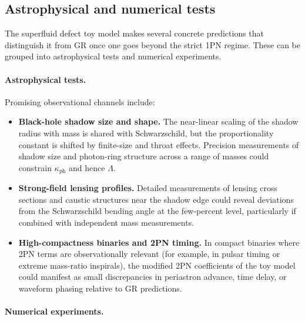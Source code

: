 \documentclass[11pt]{article}
\begin{document}
\subsection{Astrophysical and numerical tests}
\label{subsec:predictions-tests}

The superfluid defect toy model makes several concrete predictions that
distinguish it from GR once one goes beyond the strict 1PN regime.  These
can be grouped into astrophysical tests and numerical experiments.

\paragraph{Astrophysical tests.}

Promising observational channels include:
\begin{itemize}
  \item \textbf{Black-hole shadow size and shape.}
        The near-linear scaling of the shadow radius with mass is shared
        with Schwarzschild, but the proportionality constant is shifted by
        finite-size and throat effects.  Precision measurements of shadow
        size and photon-ring structure across a range of masses could
        constrain \(\kappa_{\text{ph}}\) and hence \(\Lambda\).
  \item \textbf{Strong-field lensing profiles.}
        Detailed measurements of lensing cross sections and caustic
        structures near the shadow edge could reveal deviations from the
        Schwarzschild bending angle at the few-percent level, particularly
        if combined with independent mass measurements.
  \item \textbf{High-compactness binaries and 2PN timing.}
        In compact binaries where 2PN terms are observationally relevant
        (for example, in pulsar timing or extreme mass-ratio inspirals),
        the modified 2PN coefficients of the toy model could manifest as
        small discrepancies in periastron advance, time delay, or waveform
        phasing relative to GR predictions.
\end{itemize}

\paragraph{Numerical experiments.}
\end{document}
